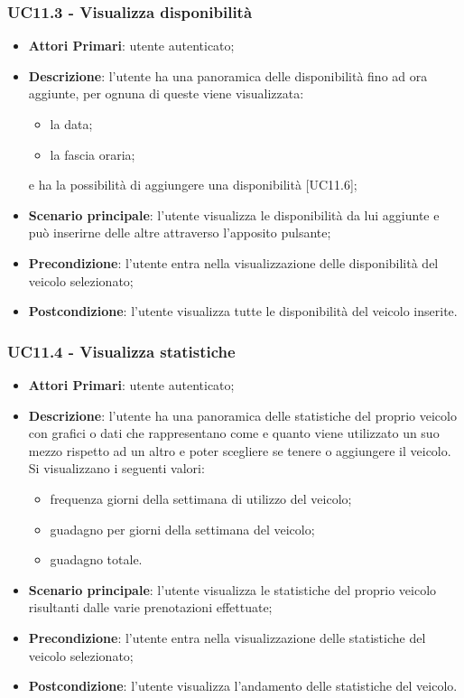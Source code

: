 \subsubsection{UC11.3 - Visualizza disponibilità}
\begin{itemize}
	\item \textbf{Attori Primari}: utente autenticato;
	\item \textbf{Descrizione}: l'utente ha una panoramica delle disponibilità fino ad ora aggiunte, per ognuna di queste viene visualizzata:
	\begin{itemize}
		\item la data;
		\item la fascia oraria;
	\end{itemize} 
	e ha la possibilità di aggiungere una disponibilità [UC11.6];
	\item \textbf{Scenario principale}: l'utente visualizza le disponibilità da lui aggiunte e può inserirne delle altre attraverso l'apposito pulsante;
	\item \textbf{Precondizione}: l'utente entra nella visualizzazione delle disponibilità del veicolo selezionato;
	\item \textbf{Postcondizione}: l'utente visualizza tutte le disponibilità del veicolo inserite. 
\end{itemize}
\subsubsection{UC11.4 - Visualizza statistiche}
\begin{itemize}
	\item \textbf{Attori Primari}: utente autenticato;
	\item \textbf{Descrizione}: l'utente ha una panoramica delle statistiche del proprio veicolo con grafici o dati che rappresentano come e quanto viene utilizzato un suo mezzo rispetto ad un altro e poter scegliere se tenere o aggiungere il veicolo. Si visualizzano i seguenti valori:
	\begin{itemize}
		\item frequenza giorni della settimana di utilizzo del veicolo;
		\item guadagno per giorni della settimana del veicolo;
		\item guadagno totale.
	\end{itemize}
	\item \textbf{Scenario principale}: l'utente visualizza le statistiche del proprio veicolo risultanti dalle varie prenotazioni effettuate;
	\item \textbf{Precondizione}: l'utente entra nella visualizzazione delle statistiche del veicolo selezionato;
	\item \textbf{Postcondizione}: l'utente visualizza l'andamento delle statistiche del veicolo. 
\end{itemize}
